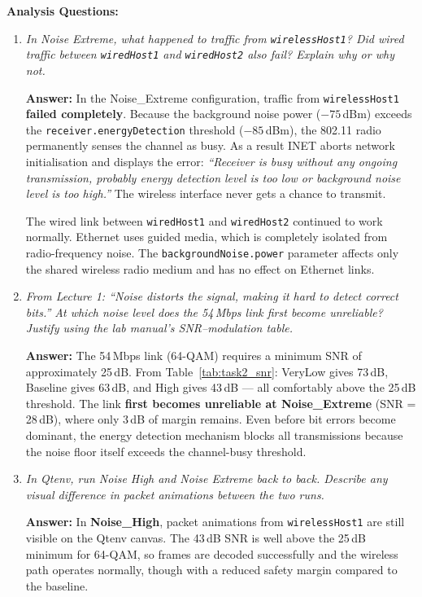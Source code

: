 \documentclass[12pt]{article}
\begin{document}
\textbf{Analysis Questions:}
\begin{enumerate}

    \item \textit{In Noise Extreme, what happened to traffic from
          \texttt{wirelessHost1}? Did wired traffic between \texttt{wiredHost1}
          and \texttt{wiredHost2} also fail? Explain why or why not.}

    \textbf{Answer:}
    In the Noise\_Extreme configuration, traffic from \texttt{wirelessHost1}
    \textbf{failed completely}. Because the background noise power
    ($-75$\,dBm) exceeds the \texttt{receiver.energyDetection} threshold
    ($-85$\,dBm), the 802.11 radio permanently senses the channel as busy. As
    a result INET aborts network initialisation and displays the error:
    \textit{``Receiver is busy without any ongoing transmission, probably energy
    detection level is too low or background noise level is too high.''} The
    wireless interface never gets a chance to transmit.

    The wired link between \texttt{wiredHost1} and \texttt{wiredHost2}
    continued to work normally. Ethernet uses guided media, which is completely
    isolated from radio-frequency noise. The \texttt{backgroundNoise.power}
    parameter affects only the shared wireless radio medium and has no effect on
    Ethernet links.

    \item \textit{From Lecture 1: ``Noise distorts the signal, making it hard to
          detect correct bits.'' At which noise level does the 54\,Mbps link first
          become unreliable? Justify using the lab manual's SNR--modulation table.}

    \textbf{Answer:}
    The 54\,Mbps link (64-QAM) requires a minimum SNR of approximately 25\,dB.
    From Table~\ref{tab:task2_snr}: VeryLow gives 73\,dB, Baseline gives 63\,dB,
    and High gives 43\,dB --- all comfortably above the 25\,dB threshold. The link
    \textbf{first becomes unreliable at Noise\_Extreme} (SNR = 28\,dB), where only
    3\,dB of margin remains. Even before bit errors become dominant, the energy
    detection mechanism blocks all transmissions because the noise floor itself
    exceeds the channel-busy threshold.

    \item \textit{In Qtenv, run Noise High and Noise Extreme back to back. Describe
          any visual difference in packet animations between the two runs.}

    \textbf{Answer:}
    In \textbf{Noise\_High}, packet animations from \texttt{wirelessHost1} are still
    visible on the Qtenv canvas. The 43\,dB SNR is well above the 25\,dB minimum for
    64-QAM, so frames are decoded successfully and the wireless path operates normally,
    though with a reduced safety margin compared to the baseline.


\end{enumerate}
\end{document}
